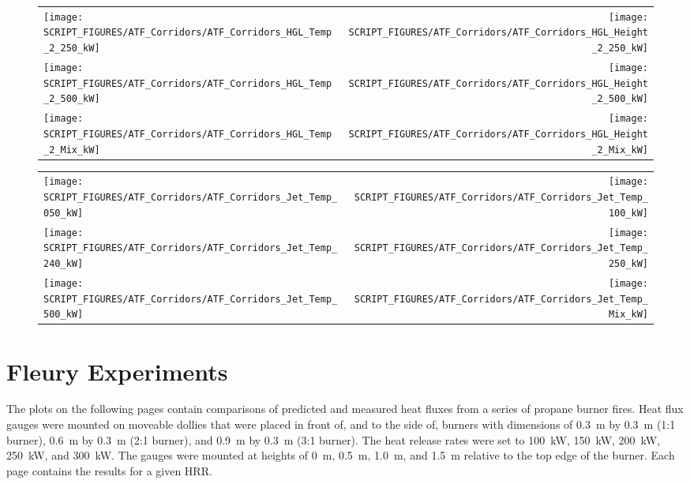 \begin{figure}
\begin{tabular*}{\textwidth}{l@{\extracolsep{\fill}}r}
\texttt{[image: SCRIPT\_FIGURES/ATF\_Corridors/ATF\_Corridors\_HGL\_Temp\_2\_250\_kW]} &
\texttt{[image: SCRIPT\_FIGURES/ATF\_Corridors/ATF\_Corridors\_HGL\_Height\_2\_250\_kW]} \\
\texttt{[image: SCRIPT\_FIGURES/ATF\_Corridors/ATF\_Corridors\_HGL\_Temp\_2\_500\_kW]} &
\texttt{[image: SCRIPT\_FIGURES/ATF\_Corridors/ATF\_Corridors\_HGL\_Height\_2\_500\_kW]} \\
\texttt{[image: SCRIPT\_FIGURES/ATF\_Corridors/ATF\_Corridors\_HGL\_Temp\_2\_Mix\_kW]} &
\texttt{[image: SCRIPT\_FIGURES/ATF\_Corridors/ATF\_Corridors\_HGL\_Height\_2\_Mix\_kW]}
\end{tabular*}
\end{figure}

\begin{figure}
\begin{tabular*}{\textwidth}{l@{\extracolsep{\fill}}r}
\texttt{[image: SCRIPT\_FIGURES/ATF\_Corridors/ATF\_Corridors\_Jet\_Temp\_050\_kW]} &
\texttt{[image: SCRIPT\_FIGURES/ATF\_Corridors/ATF\_Corridors\_Jet\_Temp\_100\_kW]} \\
\texttt{[image: SCRIPT\_FIGURES/ATF\_Corridors/ATF\_Corridors\_Jet\_Temp\_240\_kW]} &
\texttt{[image: SCRIPT\_FIGURES/ATF\_Corridors/ATF\_Corridors\_Jet\_Temp\_250\_kW]} \\
\texttt{[image: SCRIPT\_FIGURES/ATF\_Corridors/ATF\_Corridors\_Jet\_Temp\_500\_kW]} &
\texttt{[image: SCRIPT\_FIGURES/ATF\_Corridors/ATF\_Corridors\_Jet\_Temp\_Mix\_kW]}
\end{tabular*}
\end{figure}

\clearpage

\section{Fleury Experiments}

The plots on the following pages contain comparisons of predicted and measured heat fluxes from a series of propane burner fires. Heat flux gauges were mounted on moveable dollies that were placed in front of, and to the side of, burners with dimensions of 0.3~m by 0.3~m (1:1 burner), 0.6~m by 0.3~m (2:1 burner), and 0.9~m by 0.3~m (3:1 burner). The heat release rates were set to 100~kW, 150~kW, 200~kW, 250~kW, and 300~kW. The gauges were mounted at heights of 0~m, 0.5~m, 1.0~m, and 1.5~m relative to the top edge of the burner. Each page contains the results for a given HRR.

